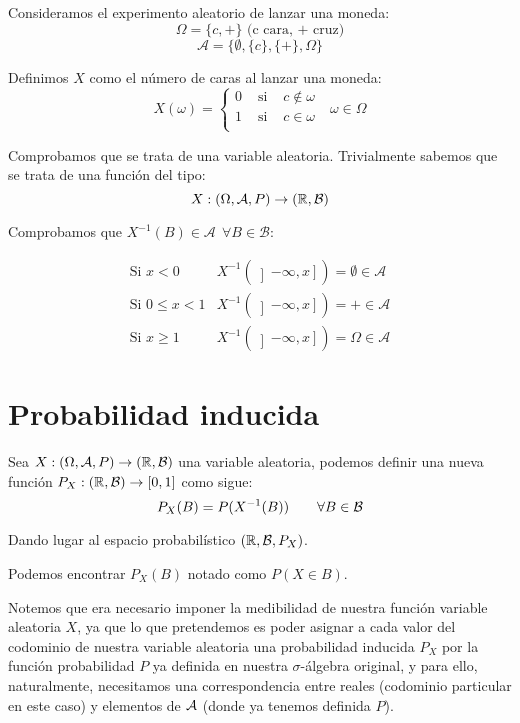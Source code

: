 \begin{ejemplo}
    Consideramos el experimento aleatorio de lanzar una moneda:
    $$\Omega = \{c, +\} \mbox{ (c cara, + cruz)}$$
    $$\mathcal{A} = \{\emptyset, \{c\}, \{+\}, \Omega \}$$
    
    Definimos $X$ como el número de caras al lanzar una moneda:
    $$X(\omega) = \left\{ \begin{array}{lcl}
        0 & \mbox{ si } & c \notin \omega \\
        1 & \mbox{ si } & c \in \omega    \\
      \end{array} \right.~~~\omega \in \Omega$$

    Comprobamos que se trata de una variable aleatoria. Trivialmente sabemos que se trata de una función del tipo:
    $$X : (\Omega, \mathcal{A}, P) \rightarrow (\mathbb R, \mathcal{B})$$
    
    Comprobamos que $X^{-1}(B) \in \mathcal{A}~~\forall B \in \mathcal{B}$:
    
    $$\begin{array}{ll}
        \mbox{Si } x<0       & X^{-1}(\left] -\infty, x \right] ) = \emptyset \in \mathcal{A} \\
        \mbox{Si } 0\leq x<1 & X^{-1}(\left] -\infty, x \right] ) = + \in \mathcal{A}         \\
        \mbox{Si } x\geq 1   & X^{-1}(\left] -\infty, x \right] ) = \Omega \in \mathcal{A}
      \end{array}$$
\end{ejemplo}

\section{Probabilidad inducida}
\begin{definicion}
    Sea $X:(\Omega, \mathcal{A}, P) \rightarrow (\mathbb R, \mathcal{B})$ una variable aleatoria, podemos definir una nueva función $P_X : (\mathbb R, \mathcal{B}) \rightarrow [0,1]$ como sigue:
    $$P_X(B) = P(X^{-1}(B)) \qquad \forall B \in \mathcal{B}$$
    
    Dando lugar al espacio probabilístico $(\mathbb R, \mathcal{B}, P_X)$.
\end{definicion}
\begin{notacion}
    Podemos encontrar $P_X(B)$ notado como $P(X \in B)$.
\end{notacion}

Notemos que era necesario imponer la medibilidad de nuestra función variable aleatoria $X$, ya que lo que pretendemos es poder asignar a cada valor del codominio de nuestra variable aleatoria una probabilidad inducida $P_X$ por la función probabilidad $P$ ya definida en nuestra $\sigma$-álgebra original, y para ello, naturalmente, necesitamos una correspondencia entre reales (codominio particular en este caso) y elementos de $\mathcal{A}$ (donde ya tenemos definida $P$).\\

